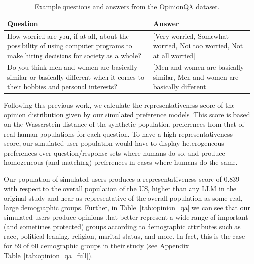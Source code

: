 \begin{table}[!ht]
    \centering
    \begin{tabular}{p{} p{}}
    \toprule
     Question & Answer\\
    \midrule
    How worried are you, if at all, about the possibility of using computer programs to make hiring decisions for society as a whole? & [Very worried, Somewhat worried, Not too worried, Not at all worried] \\
    \midrule
    Do you think men and women are basically similar or basically different when it comes to their hobbies and personal interests? & [Men and women are basically similar, Men and women are basically different] \\
    \bottomrule
    \end{tabular}
    \caption{Example questions and answers from the OpinionQA dataset.}
    \label{tab:opinion_qa_examples}

\end{table}

Following this previous work, we calculate the representativeness score of the opinion distribution given by our simulated preference models.
This score is based on the Wasserstein distance of the synthetic population preferences from that of real human populations for each question.
To have a high representativeness score, our simulated user population would have to display heterogeneous preferences over question/response sets where humans do so, and produce homogeneous (and matching) preferences in cases where humans do the same. 

Our population of simulated users produces a representativeness score of 0.839 with respect to the overall population of the US, higher than any LLM in the original study and near as representative of the overall population as some real, large demographic groups.  
Further, in Table~\ref{tab:opinion_qa} we can see that our simulated users produce opinions that better represent a wide range of important (and sometimes protected) groups according to demographic attributes such as race, political leaning, religion, marital status, and more.  
In fact, this is the case for 59 of 60 demographic groups in their study (see Appendix Table~\ref{tab:opinion_qa_full}).

